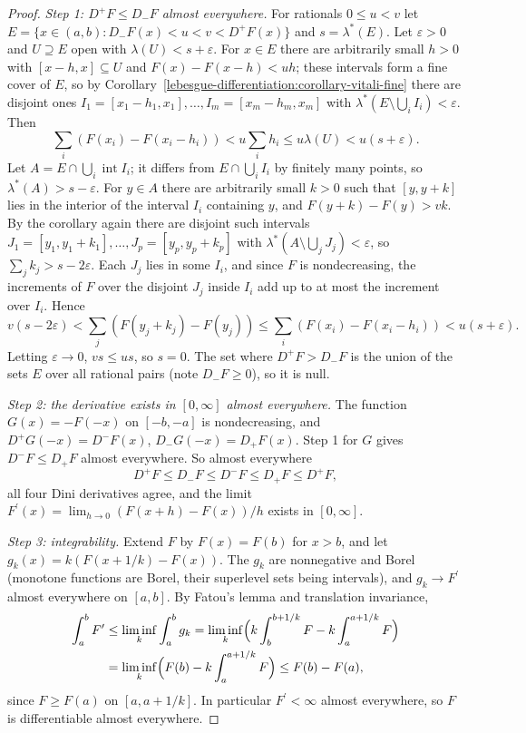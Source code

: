 \begin{proof}
\emph{Step 1: $D^+F \leq D_-F$ almost everywhere.} For rationals $0 \leq u < v$ let $E = \{x \in (a, b) : D_-F(x) < u < v < D^+F(x)\}$ and $s = \lambda^*(E)$. Let $\varepsilon > 0$ and $U \supseteq E$ open with
$\lambda(U) < s + \varepsilon$. For $x \in E$ there are arbitrarily small $h > 0$ with $[x - h, x] \subseteq U$ and $F(x) - F(x - h) < uh$; these intervals form a fine cover of $E$, so by
Corollary~\ref{lebesgue-differentiation:corollary-vitali-fine} there are disjoint ones $I_1 = [x_1 - h_1, x_1], \ldots, I_m = [x_m - h_m, x_m]$ with $\lambda^*(E \setminus \bigcup_iI_i) < \varepsilon$. Then
\[
\sum_i(F(x_i) - F(x_i - h_i)) < u\sum_ih_i \leq u\lambda(U) < u(s + \varepsilon).
\]
Let $A = E \cap \bigcup_i\operatorname{int}I_i$; it differs from $E \cap \bigcup_iI_i$ by finitely many points, so $\lambda^*(A) > s - \varepsilon$. For $y \in A$ there are arbitrarily small $k > 0$ such that $[y, y + k]$ lies
in the interior of the interval $I_i$ containing $y$, and $F(y + k) - F(y) > vk$. By the corollary again there are disjoint such intervals $J_1 = [y_1, y_1 + k_1], \ldots, J_p = [y_p, y_p + k_p]$ with
$\lambda^*(A \setminus \bigcup_jJ_j) < \varepsilon$, so $\sum_jk_j > s - 2\varepsilon$. Each $J_j$ lies in some $I_i$, and since $F$ is nondecreasing, the increments of $F$ over the disjoint $J_j$ inside $I_i$ add
up to at most the increment over $I_i$. Hence
\[
v(s - 2\varepsilon) < \sum_j(F(y_j + k_j) - F(y_j)) \leq \sum_i(F(x_i) - F(x_i - h_i)) < u(s + \varepsilon).
\]
Letting $\varepsilon \to 0$, $vs \leq us$, so $s = 0$. The set where $D^+F > D_-F$ is the union of the sets $E$ over all rational pairs (note $D_-F \geq 0$), so it is null.

\emph{Step 2: the derivative exists in $[0, \infty]$ almost everywhere.} The function $G(x) = -F(-x)$ on $[-b, -a]$ is nondecreasing, and $D^+G(-x) = D^-F(x)$, $D_-G(-x) = D_+F(x)$. Step 1 for $G$ gives
$D^-F \leq D_+F$ almost everywhere. So almost everywhere
\[
D^+F \leq D_-F \leq D^-F \leq D_+F \leq D^+F,
\]
all four Dini derivatives agree, and the limit $F^{\prime}(x) = \lim_{h \to 0}(F(x + h) - F(x))/h$ exists in $[0, \infty]$.

\emph{Step 3: integrability.} Extend $F$ by $F(x) = F(b)$ for $x > b$, and let $g_k(x) = k(F(x + 1/k) - F(x))$. The $g_k$ are nonnegative and Borel (monotone functions are Borel, their superlevel sets being
intervals), and $g_k \to F^{\prime}$ almost everywhere on $[a, b]$. By Fatou's lemma and translation invariance,
\[\begin{aligned}
\int_a^bF^{\prime} &\leq \liminf_k\int_a^bg_k = \liminf_k\Bigl(k\int_b^{b + 1/k}F - k\int_a^{a + 1/k}F\Bigr) \\
&= \liminf_k\Bigl(F(b) - k\int_a^{a + 1/k}F\Bigr) \leq F(b) - F(a),
\end{aligned}\]
since $F \geq F(a)$ on $[a, a + 1/k]$. In particular $F^{\prime} < \infty$ almost everywhere, so $F$ is differentiable almost everywhere.
\end{proof}

